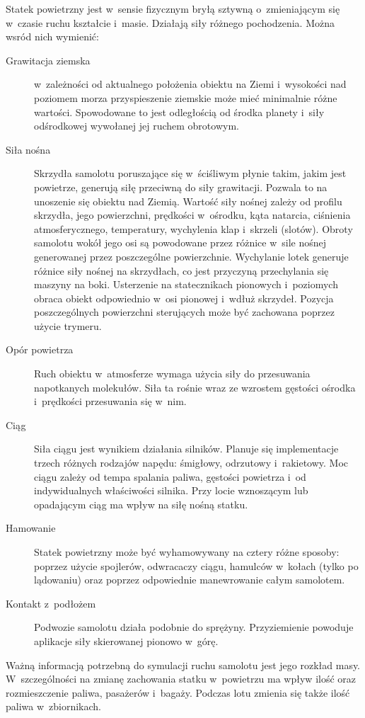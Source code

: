 \documentclass{mwrep}
\begin{document}
Statek powietrzny jest w~sensie fizycznym bryłą sztywną o~zmieniającym się w~czasie ruchu kształcie i~masie. Działają siły różnego pochodzenia. Można wsród nich wymienić:
\begin{description}
\item[Grawitacja ziemska] w~zależności od aktualnego położenia obiektu na Ziemi i~wysokości nad poziomem morza przyspieszenie ziemskie może mieć minimalnie różne wartości. Spowodowane to jest odległością od środka planety i~siły odśrodkowej wywołanej jej ruchem obrotowym.
\item[Siła nośna] Skrzydła samolotu poruszające się w~ściśliwym płynie takim, jakim jest powietrze, generują siłę przeciwną do siły grawitacji. Pozwala to na unoszenie się obiektu nad Ziemią. Wartość siły nośnej zależy od profilu skrzydła, jego powierzchni, prędkości w~ośrodku, kąta natarcia, ciśnienia atmosferycznego, temperatury, wychylenia klap i~skrzeli (slotów). Obroty samolotu wokół jego osi są powodowane przez różnice w~sile nośnej generowanej przez poszczególne powierzchnie. Wychylanie lotek generuje różnice siły nośnej na skrzydłach, co jest przyczyną przechylania się maszyny na boki. Usterzenie na statecznikach pionowych i~poziomych obraca obiekt odpowiednio w~osi pionowej i~wdłuż skrzydeł. Pozycja poszczególnych powierzchni sterujących może być zachowana poprzez użycie trymeru.
\item[Opór powietrza] Ruch obiektu w~atmosferze wymaga użycia siły do przesuwania napotkanych molekułów. Siła ta rośnie wraz ze wzrostem gęstości ośrodka i~prędkości przesuwania się w~nim.
\item[Ciąg] Siła ciągu jest wynikiem działania silników. Planuje się implementacje trzech różnych rodzajów napędu: śmigłowy, odrzutowy i~rakietowy. Moc ciągu zależy od tempa spalania paliwa, gęstości powietrza i~od indywidualnych właściwości silnika. Przy locie wznoszącym lub opadającym ciąg ma wpływ na siłę nośną statku.
\item[Hamowanie] Statek powietrzny może być wyhamowywany na cztery różne sposoby: poprzez użycie spojlerów, odwracaczy ciągu, hamulców w~kołach (tylko po lądowaniu) oraz poprzez odpowiednie manewrowanie całym samolotem.
\item[Kontakt z~podłożem] Podwozie samolotu działa podobnie do sprężyny. Przyziemienie powoduje aplikacje siły skierowanej pionowo w~górę.
\end{description}

\vspace*{\baselineskip}
Ważną informacją potrzebną do symulacji ruchu samolotu jest jego rozkład masy. W~szczególności na zmianę zachowania statku w~powietrzu ma wpływ ilość oraz rozmieszczenie paliwa, pasażerów i~bagaży. Podczas lotu zmienia się także ilość paliwa w~zbiornikach.
\end{document}
